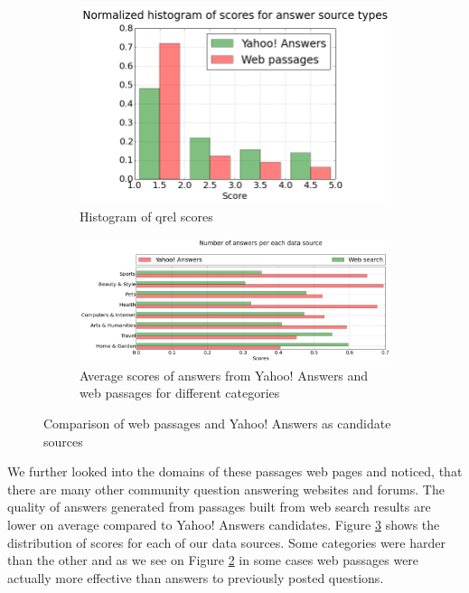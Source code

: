 \documentclass[]{article}
\begin{document}
\begin{figure}
\centering
	\begin{subfigure}[b]{0.38\textwidth}
	\includegraphics[width=\textwidth]{img/answer_source_scores}
	\caption{Histogram of qrel scores}
	\label{figure:answer_source:scores}
	\end{subfigure}
	\begin{subfigure}[b]{0.6\textwidth}
	\includegraphics[width=\textwidth]{img/answer_source_by_category}
	\caption{Average scores of answers from Yahoo! Answers and web passages for different categories}
	\label{figure:answer_source:category}
	\end{subfigure}
	\caption{Comparison of web passages and Yahoo! Answers as candidate sources}
	\label{figure:answer_source}
\end{figure}

We further looked into the domains of these passages web pages and noticed, that there are many other community question answering websites and forums.
The quality of answers generated from passages built from web search results are lower on average compared to Yahoo! Answers candidates.
Figure \ref{figure:answer_source} shows the distribution of scores for each of our data sources.
Some categories were harder than the other \cite{liveqa} and as we see on Figure \ref{figure:answer_source:category} in some cases web passages were actually more effective than answers to previously posted questions.
\end{document}
